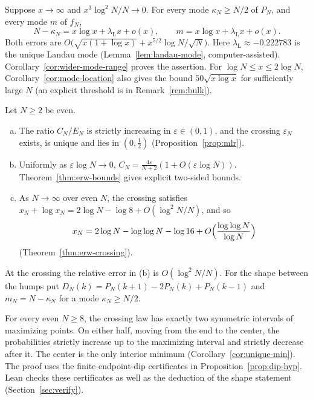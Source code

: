 \begin{theorem}\label{thm:main-modes}
Suppose $x\to\infty$ and $x^3\log^2N/N\to0$. For every mode
$\kappa_N\ge N/2$ of $P_N$, and every mode $m$ of $f_N$,
\[
 N-\kappa_N=x\log x+\lambda_{\mathrm L}x+o(x),\qquad
 m=x\log x+\lambda_{\mathrm L}x+o(x).
\]
Both errors are
$O\bigl(\sqrt{x(1+\log x)}+x^{5/2}\log N/\sqrt N\bigr)$.
Here $\lambda_{\mathrm L}\approx-0.222783$ is the unique Landau mode
(Lemma~\ref{lem:landau-mode}, computer-assisted).
Corollary~\ref{cor:wider-mode-range} proves the assertion.
For $\log N\le x\le2\log N$, Corollary~\ref{cor:mode-location}
also gives the bound $50\sqrt{x\log x}$ for sufficiently large $N$
(an explicit threshold is in Remark~\ref{rem:bulk}).
\end{theorem}

\begin{theorem}\label{thm:main-center}
Let $N\ge2$ be even.
\begin{enumerate}[(a)]
\item The ratio $C_N/E_N$ is strictly increasing in $\varepsilon\in(0,1)$, and
the crossing $\varepsilon_N$ exists, is unique and lies in $(0,\frac12)$
(Proposition~\ref{prop:mlr}).
\item Uniformly as $\varepsilon\log N\to0$,
$C_N=\frac{4\varepsilon}{N+2}(1+O(\varepsilon\log N))$.
Theorem~\ref{thm:erw-bounds} gives explicit two-sided bounds.
\item As $N\to\infty$ over even $N$, the crossing satisfies
$x_N+\log x_N=2\log N-\log8+O(\log^2N/N)$, and so
\[
 x_N=2\log N-\log\log N-\log16+O\Bigl(\frac{\log\log N}{\log N}\Bigr)
\]
(Theorem~\ref{thm:erw-crossing}).
\end{enumerate}
\end{theorem}

At the crossing the relative error in (b) is $O(\log^2N/N)$.
For the shape between the humps put
$D_N(k)=P_N(k+1)-2P_N(k)+P_N(k-1)$ and $m_N=N-\kappa_N$ for a mode $\kappa_N\ge N/2$.

\begin{theorem}\label{thm:main-shape}
For every even $N\ge8$, the crossing law has exactly two symmetric
intervals of maximizing points. On either half, moving from the end
to the center, the probabilities strictly increase up to the maximizing
interval and strictly decrease after it. The center is the only
interior minimum (Corollary~\ref{cor:unique-min}). The proof uses the
finite endpoint-dip certificates in Proposition~\ref{prop:dip-hyp}.
Lean checks these certificates as well as the deduction of the shape
statement (Section~\ref{sec:verify}).
\end{theorem}

